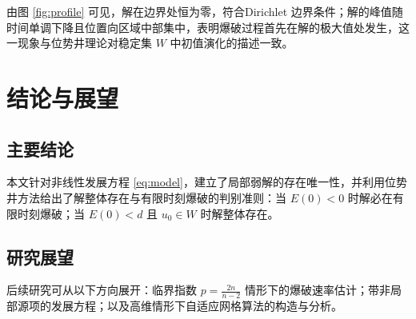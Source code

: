 \documentclass[12pt,a4paper,twoside,openright]{ctexbook}
\numberwithin{figure}{chapter}
\numberwithin{table}{chapter}
\numberwithin{equation}{chapter}
\theoremstyle{ncwuthm}
\begin{document}
由图 \ref{fig:profile} 可见，解在边界处恒为零，符合Dirichlet 边界条件；解的峰值随时间单调下降且位置向区域中部集中，表明爆破过程首先在解的极大值处发生，这一现象与位势井理论对稳定集 $W$ 中初值演化的描述一致。

\chapter{结论与展望}
\label{chap:con}
\section{主要结论}
本文针对非线性发展方程 \eqref{eq:model}，建立了局部弱解的存在唯一性，并利用位势井方法给出了解整体存在与有限时刻爆破的判别准则：当 $E(0)<0$ 时解必在有限时刻爆破；当 $E(0)<d$ 且 $u_0\in W$ 时解整体存在。

\section{研究展望}
后续研究可从以下方向展开：临界指数 $p=\frac{2n}{n-2}$ 情形下的爆破速率估计；带非局部源项的发展方程；以及高维情形下自适应网格算法的构造与分析。
\end{document}
